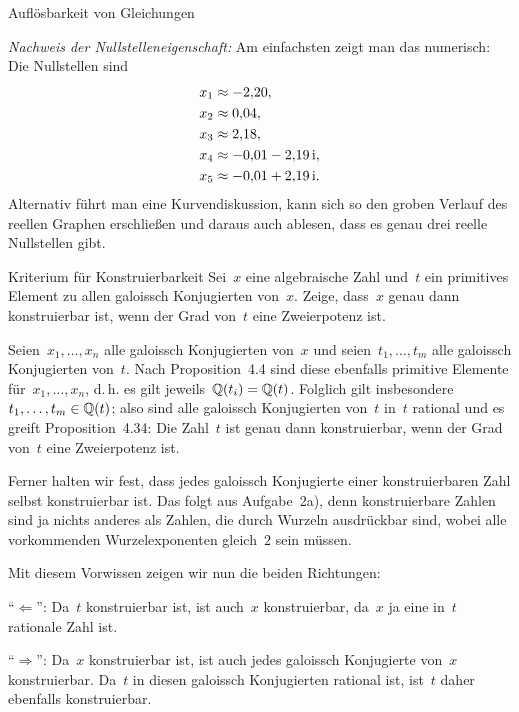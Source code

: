 \documentclass{algblatt}
\begin{document}
\begin{aufgabe}{Auflösbarkeit von Gleichungen}
\begin{loesungE}
\emph{Nachweis der Nullstelleneigenschaft:} Am einfachsten zeigt man das
numerisch: Die Nullstellen sind
\begin{align*}
  x_1 &\approx -2{,}20, \\
  x_2 &\approx 0{,}04, \\
  x_3 &\approx 2{,}18, \\
  x_4 &\approx -0{,}01 - 2{,}19\,\mathrm{i}, \\
  x_5 &\approx -0{,}01 + 2{,}19\,\mathrm{i}.
\end{align*}
Alternativ führt man eine Kurvendiskussion, kann sich so den groben Verlauf des
reellen Graphen erschließen und daraus auch ablesen, dass es genau drei reelle
Nullstellen gibt.
\end{loesungE}
\end{aufgabe}

\begin{aufgabe}{Kriterium für Konstruierbarkeit}
Sei~$x$ eine algebraische Zahl und~$t$ ein primitives Element zu allen galoissch
Konjugierten von~$x$. Zeige, dass~$x$ genau dann konstruierbar ist, wenn der
Grad von~$t$ eine Zweierpotenz ist.

\begin{loesung}
Seien~$x_1,\ldots,x_n$ alle galoissch Konjugierten von~$x$ und
seien~$t_1,\ldots,t_m$ alle galoissch Konjugierten von~$t$. Nach
Proposition~4.4 sind diese ebenfalls primitive Elemente für~$x_1,\ldots,x_n$,
d.\,h. es gilt jeweils~$\mathbb{Q}(t_i) = \mathbb{Q}(t)$. Folglich gilt
insbesondere~$t_1,\ldots,t_m \in \mathbb{Q}(t)$; also sind alle galoissch Konjugierten
von~$t$ in~$t$ rational und es greift Proposition~4.34: Die Zahl~$t$ ist genau
dann konstruierbar, wenn der Grad von~$t$ eine Zweierpotenz ist.

Ferner halten wir fest, dass jedes galoissch Konjugierte einer konstruierbaren
Zahl selbst konstruierbar ist. Das folgt aus Aufgabe~2a), denn konstruierbare
Zahlen sind ja nichts anderes als Zahlen, die durch Wurzeln ausdrückbar sind,
wobei alle vorkommenden Wurzelexponenten gleich~$2$ sein müssen.

Mit diesem Vorwissen zeigen wir nun die beiden Richtungen:

"`$\Longleftarrow$"': Da~$t$ konstruierbar ist, ist auch~$x$
konstruierbar, da~$x$ ja eine in~$t$ rationale Zahl ist.

"`$\Longrightarrow$"': Da~$x$ konstruierbar ist, ist auch jedes galoissch
Konjugierte von~$x$ konstruierbar. Da~$t$ in diesen galoissch Konjugierten
rational ist, ist~$t$ daher ebenfalls konstruierbar.
\end{loesung}
\end{aufgabe}
\end{document}
